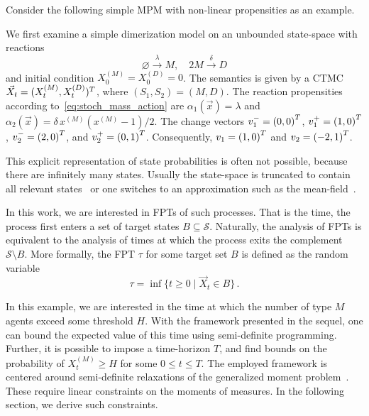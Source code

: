 Consider the following simple \ac{MPM} with non-linear propensities as an example.
\begin{model}[Dimerization]\label{model:dim}
  We first examine a simple dimerization model on an unbounded state-space with
  reactions
  $$\varnothing\xrightarrow{\lambda}M,\quad 2M\xrightarrow{\delta}D$$
  and initial condition $X_0^{(M)}=X_0^{(D)}=0$. The semantics is given by a
	\ac{CTMC}
  $\vec{X}_t=(X_t^{(M)}, X_t^{(D)})^{T}$, where $(S_1, S_2)=(M,D)$. The reaction
  propensities according to~\eqref{eq:stoch_mass_action}
  are $\alpha_1(\vec{x})=\lambda$ and $\alpha_2(\vec{x})=\delta\, x^{(M)} (x^{(M)} -
  1)/2$. The change vectors $v_1^-={(0,0)}^{T}$, $v_1^+={(1,0)}^{T}$,
  $v_2^-={(2,0)}^{T}$, and $v_2^{+}={(0,1)}^{T}$.
  Consequently, $v_1={(1,0)}^{T}$ and $v_2={(-2, 1)}^{T}$.
\end{model}

This explicit representation of state probabilities is often not possible, because
there are infinitely many states. Usually the state-space is truncated to contain all
relevant states~\cite{andreychenko2011parameter} or one switches to
an approximation such as the mean-field~\cite{bortolussi2013}.

In this work, we are interested in \acfp{FPT} of such processes.
That is the time, the process first enters a set of target states
$B\subseteq \mathcal{S}$. Naturally, the analysis of \acp{FPT} is
equivalent
to the analysis of times at which the process exits the complement $\mathcal{S}\setminus B$.
More formally, the \acl{FPT} $\tau$ for
some target set $B$ is defined as the random variable
\begin{equation}\label{eq:fpt_def}
    \tau = \inf\{t\geq 0\mid \vec X_t \in B\}\,.
\end{equation}


In this example, we are interested in the time at which the number of type $M$ agents
exceed some threshold $H$.
With the framework presented in the sequel, one can bound the expected value
of this time using semi-definite programming.
Further, it is possible to impose a time-horizon $T$, and find bounds
on the probability of $ X_t^{(M)}\geq H$ for some $0\leq t\leq T$.
The employed framework is centered around semi-definite relaxations
of the generalized moment problem~\cite{lasserre2010moments}.
These require linear constraints on the moments of measures.
In the following section, we derive such constraints.

